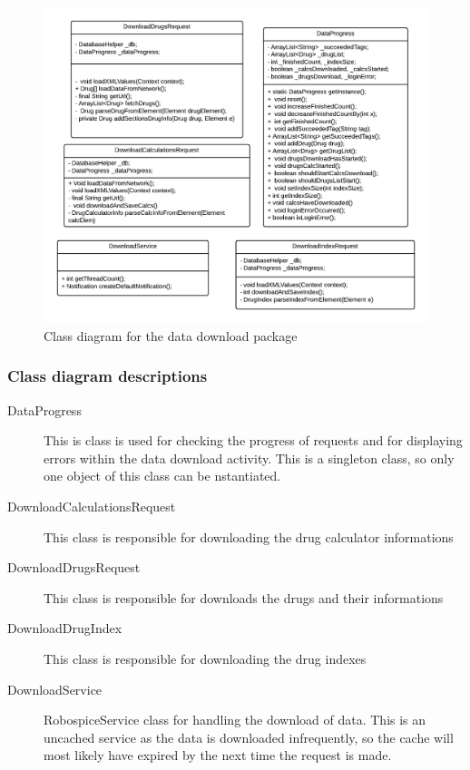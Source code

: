 \documentclass[11pt,fleqn,twoside]{article}
\begin{document}
\begin{figure}[H]
\centering
\includegraphics[width=6.5in]{download}
\caption{Class diagram for the data download package}
\end{figure}

\subsubsection{Class diagram descriptions}
\begin{description}
	\item[DataProgress] This is class is used for checking the progress of requests and for displaying errors within the data download activity. This is a singleton class, so only one object of this class can be nstantiated.
\	\item[DownloadCalculationsRequest] This class is responsible for downloading the drug calculator informations
	\item[DownloadDrugsRequest] This class is responsible for downloads the drugs and their informations
	\item[DownloadDrugIndex] This class is responsible for downloading the drug indexes
	\item[DownloadService] RobospiceService class for handling the download of data. This is an uncached service as the data is downloaded infrequently, so the cache will most likely have expired by the next time the request is made.
\end{description}
\end{document}
